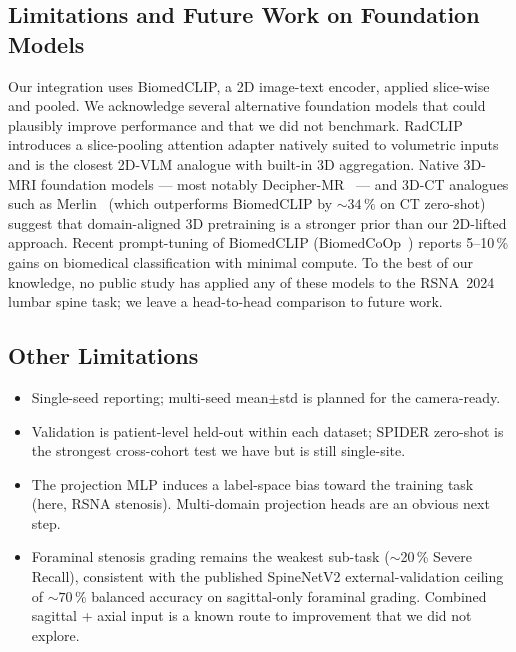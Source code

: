 \subsection{Limitations and Future Work on Foundation Models}
\label{sec:foundation-future}
Our integration uses BiomedCLIP, a 2D image-text encoder, applied
slice-wise and pooled. We acknowledge several alternative foundation
models that could plausibly improve performance and that we did not
benchmark. RadCLIP~\cite{lu2024radclip} introduces a slice-pooling
attention adapter natively suited to volumetric inputs and is the
closest 2D-VLM analogue with built-in 3D aggregation. Native 3D-MRI
foundation models — most notably
Decipher-MR~\cite{yang2026deciphermr} — and 3D-CT analogues such as
Merlin~\cite{blankemeier2026merlin} (which outperforms BiomedCLIP by
${\sim}34\,\%$ on CT zero-shot) suggest that domain-aligned 3D
pretraining is a stronger prior than our 2D-lifted approach. Recent
prompt-tuning of BiomedCLIP (BiomedCoOp~\cite{koleilat2025biomedcoop})
reports 5--10\,\% gains on biomedical classification with minimal
compute. To the best of our knowledge, no public study has applied any
of these models to the RSNA~2024 lumbar spine task; we leave a
head-to-head comparison to future work.

\subsection{Other Limitations}
\begin{itemize}
  \item Single-seed reporting; multi-seed mean$\pm$std is planned for
        the camera-ready.
  \item Validation is patient-level held-out within each dataset;
        SPIDER zero-shot is the strongest cross-cohort test we have
        but is still single-site.
  \item The projection MLP induces a label-space bias toward the
        training task (here, RSNA stenosis). Multi-domain projection
        heads are an obvious next step.
  \item Foraminal stenosis grading remains the weakest sub-task
        ($\sim$20\,\% Severe Recall), consistent with the published
        SpineNetV2 external-validation
        ceiling~\cite{nigru2024spinenetv2} of ${\sim}70\,\%$ balanced
        accuracy on sagittal-only foraminal grading. Combined sagittal
        + axial input is a known route to improvement that we did not
        explore.
\end{itemize}
